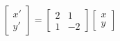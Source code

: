 \documentclass[preview]{standalone}
\begin{document}
\begin{align*}
\begin{bmatrix} x' \\ y' \end{bmatrix} = \begin{bmatrix} 2 & 1 \\ 1 & -2 \end{bmatrix} \begin{bmatrix} x \\ y \end{bmatrix}
\end{align*}
\end{document}
